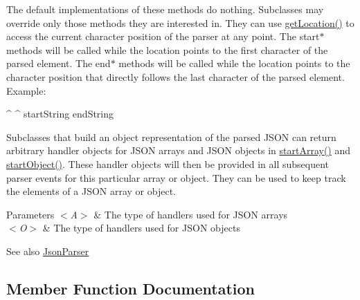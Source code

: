 The default implementations of these methods do nothing. Subclasses may override only those methods they are interested in. They can use {\ttfamily \hyperlink{classcom_1_1ingeniigroup_1_1stratux_1_1_tools_1_1_json_micro_1_1_json_handler_acf54207d456ddecc995f69bcfa22b1dd}{get\+Location()}} to access the current character position of the parser at any point. The {\ttfamily start$\ast$} methods will be called while the location points to the first character of the parsed element. The {\ttfamily end$\ast$} methods will be called while the location points to the character position that directly follows the last character of the parsed element. Example\+: 


\begin{DoxyPre}
 ^            ^
 startString  endString
\end{DoxyPre}
 

Subclasses that build an object representation of the parsed J\+S\+ON can return arbitrary handler objects for J\+S\+ON arrays and J\+S\+ON objects in \hyperlink{classcom_1_1ingeniigroup_1_1stratux_1_1_tools_1_1_json_micro_1_1_json_handler_a573309df4295cb6a107c2936aa75bb85}{start\+Array()} and \hyperlink{classcom_1_1ingeniigroup_1_1stratux_1_1_tools_1_1_json_micro_1_1_json_handler_aeabcd8c9629a3266d432eaada3e62a01}{start\+Object()}. These handler objects will then be provided in all subsequent parser events for this particular array or object. They can be used to keep track the elements of a J\+S\+ON array or object. 


\begin{DoxyParams}{Parameters}
{\em $<$\+A$>$} & The type of handlers used for J\+S\+ON arrays \\
\hline
{\em $<$\+O$>$} & The type of handlers used for J\+S\+ON objects \\
\hline
\end{DoxyParams}
\begin{DoxySeeAlso}{See also}
\hyperlink{classcom_1_1ingeniigroup_1_1stratux_1_1_tools_1_1_json_micro_1_1_json_parser}{Json\+Parser} 
\end{DoxySeeAlso}


\subsection{Member Function Documentation}
\mbox{\label{classcom_1_1ingeniigroup_1_1stratux_1_1_tools_1_1_json_micro_1_1_json_handler_a7581918f0280246021ef7a412799c83e}} 
